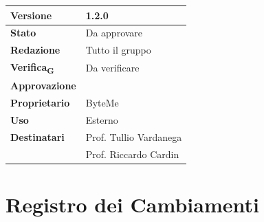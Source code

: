 \documentclass[11pt,a4paper]{article}
\newcommand{\gls}[1]{#1\textsubscript{G}}
\begin{document}
\begin{titlepage}
    \begin{table}[H]
        \centering
        \begin{tabular}{|l|p{5cm}|}
            \hline
            \textbf{Versione} & 1.2.0 \\
            \hline
            \textbf{Stato} & Da approvare\\
            \hline
            \textbf{Redazione} & Tutto il gruppo \\
            \hline
            \textbf{\gls{Verifica}} & Da verificare \\
            \hline
            \textbf{Approvazione} & \\
            \hline
            \textbf{Proprietario} & ByteMe \\
            \hline
            \textbf{Uso} & Esterno \\
            \hline
            \textbf{Destinatari} & Prof. Tullio Vardanega \\ & Prof. Riccardo Cardin \\
            \hline
        \end{tabular}
    \end{table}
    
    \vfill
\end{titlepage}

\thispagestyle{empty}
\section*{Registro dei Cambiamenti}
\end{document}
